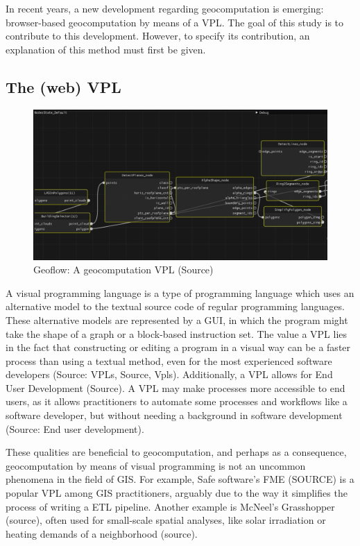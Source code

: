 In recent years, a new development regarding geocomputation is emerging:
browser-based geocomputation by means of a \ac{VPL}.
The goal of this study is to contribute to this development. 
However, to specify its contribution, an explanation of this method must first be given.

\subsection*{The (web) VPL}

\begin{figure}
  \centering
  \graphicspath{{../../assets/images/background/geo-vpl/}}
  \includegraphics[width=\linewidth]{geoflow.png}
  \caption{Geoflow: A geocomputation VPL (Source)}
  \label{fig:1:geoflow}
\end{figure}

A visual programming language is a type of programming language which uses an alternative model to the textual source code of regular programming languages. 
These alternative models are represented by a \ac{GUI}, in which the program might take the shape of a graph or a block-based instruction set. 
The value a VPL lies in the fact that constructing or editing a program in a visual way can be a faster process than using a textual method, even for the most experienced software developers (Source: VPLs, Source, Vpls). 
Additionally, a \ac{VPL} allows for End User Development (Source). 
A \ac{VPL} may make processes more accessible to end users, as it allows practitioners to automate some processes and workflows like a software developer, but without needing a background in software development (Source: End user development). 

These qualities are beneficial to geocomputation, and perhaps as a consequence, geocomputation by means of visual programming is not an uncommon phenomena in the field of \ac{GIS}.
For example, Safe software's FME (SOURCE) is a popular \ac{VPL} among \ac{GIS} practitioners, arguably due to the way it simplifies the process of writing a \ac{ETL} pipeline. 
Another example is McNeel's Grasshopper (source), often used for small-scale spatial analyses, like solar irradiation or heating demands of a neighborhood (source). 

